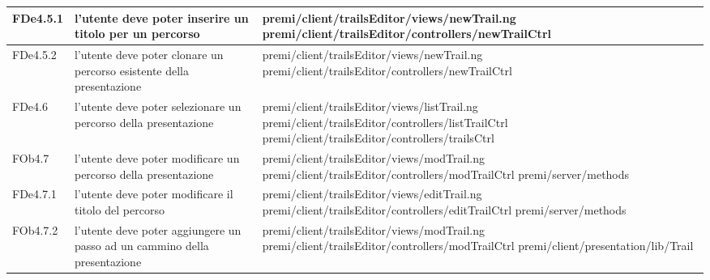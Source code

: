 \begin{longtable}{|l|p{5cm}|p{7cm}|}
\hline
FDe4.5.1 & l'utente deve poter inserire un titolo per un percorso & \hspace{0pt}premi/client/trailsEditor/views/newTrail.ng \linebreak \linebreak premi/client/trailsEditor/controllers/newTrailCtrl \\
\hline
FDe4.5.2 & l'utente deve poter clonare un percorso esistente della presentazione & \hspace{0pt}premi/client/trailsEditor/views/newTrail.ng \linebreak \linebreak premi/client/trailsEditor/controllers/newTrailCtrl \\
\hline
FDe4.6 & l'utente deve poter selezionare un percorso della presentazione & \hspace{0pt}premi/client/trailsEditor/views/listTrail.ng \linebreak \linebreak premi/client/trailsEditor/controllers/listTrailCtrl \linebreak \linebreak premi/client/trailsEditor/controllers/trailsCtrl \\
\hline
FOb4.7 & l'utente deve poter modificare un percorso della presentazione & \hspace{0pt}premi/client/trailsEditor/views/modTrail.ng \linebreak \linebreak premi/client/trailsEditor/controllers/modTrailCtrl  \linebreak \linebreak premi/server/methods  \\
\hline
FDe4.7.1 & l'utente deve poter modificare il titolo del percorso & \hspace{0pt}premi/client/trailsEditor/views/editTrail.ng \linebreak \linebreak premi/client/trailsEditor/controllers/editTrailCtrl  \linebreak \linebreak premi/server/methods  \\
\hline
FOb4.7.2 & l'utente deve poter aggiungere un passo ad un cammino della presentazione & \hspace{0pt}premi/client/trailsEditor/views/modTrail.ng \linebreak \linebreak premi/client/trailsEditor/controllers/modTrailCtrl \linebreak \linebreak premi/client/presentation/lib/Trail \\

\end{longtable}
